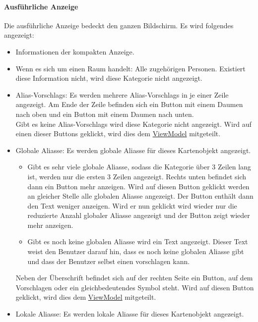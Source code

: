 \paragraph*{Ausführliche Anzeige}
Die ausführliche Anzeige bedeckt den ganzen Bildschirm.
Es wird folgendes angezeigt:
\begin{itemize}
    \item Informationen der kompakten Anzeige.
    \item Wenn es sich um einen Raum handelt: Alle zugehörigen Personen. 
    Existiert diese Information nicht, wird diese Kategorie nicht angezeigt.
    \item \Glspl{Alias-Vorschlag}: Es werden mehrere \Glspl{Alias-Vorschlag} in je einer Zeile angezeigt. 
    Am Ende der Zeile befinden sich ein Button mit einem Daumen nach oben und ein Button mit einem Daumen nach unten.\\
    Gibt es keine \Glspl{Alias-Vorschlag} wird diese Kategorie nicht angezeigt. 
    Wird auf einen dieser Buttons geklickt, wird dies dem \hyperref[App_ViewModel]{ViewModel} mitgeteilt.
    \item Globale Aliasse: Es werden globale Aliasse für dieses Kartenobjekt angezeigt.
    \begin{itemize}
        \item Gibt es sehr viele globale Aliasse, sodass die Kategorie über 3 Zeilen lang ist, werden nur 
        die ersten 3 Zeilen angezeigt. Rechts unten befindet sich dann ein Button \dq{}mehr anzeigen\dq{}. 
        Wird auf diesen Button geklickt werden an gleicher Stelle alle globalen Aliasse angezeigt. 
        Der Button enthält dann den Text \dq{}weniger anzeigen\dq{}. Wird er nun geklickt wird wieder nur die 
        reduzierte Anzahl globaler Aliasse angezeigt und der Button zeigt wieder \dq{}mehr anzeigen\dq{}.
        \item Gibt es noch keine globalen Aliasse wird ein Text angezeigt. Dieser Text weist den Benutzer 
        darauf hin, dass es noch keine globalen Aliasse gibt und dass der Benutzer selbst einen vorschlagen kann.
    \end{itemize}
    Neben der Überschrift befindet sich auf der rechten Seite ein Button, auf dem \dq{}Vorschlagen\dq{} oder ein gleichbedeutendes Symbol steht.
    Wird auf diesen Button geklickt, wird dies dem \hyperref[App_ViewModel]{ViewModel} mitgeteilt.
    \item Lokale Aliasse: Es werden lokale Aliasse für dieses Kartenobjekt angezeigt. 
    \begin{itemize}

\end{itemize}
\end{itemize}
